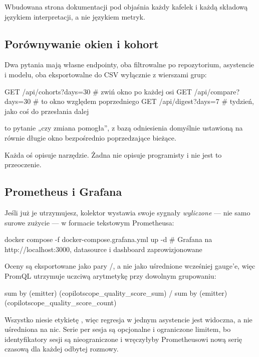 \documentclass[11pt,a4paper]{article}
\newcommand{\code}[1]{\texttt{\detokenize{#1}}}
\begin{document}
Wbudowana strona dokumentacji pod \code{/docs} objaśnia każdy kafelek i każdą
składową językiem interpretacji, a nie językiem metryk.

\subsection{Porównywanie okien i kohort}

Dwa pytania mają własne endpointy, oba filtrowalne po repozytorium, asystencie i
modelu, oba eksportowalne do CSV wyłącznie z wierszami grup:

\begin{shell}
GET /api/cohorts?days=30      # zwiń okno po każdej osi
GET /api/compare?days=30      # to okno względem poprzedniego
GET /api/digest?days=7        # tydzień, jako coś do przesłania dalej
\end{shell}

\code{/api/compare} to pytanie „czy zmiana pomogła'', z bazą odniesienia
domyślnie ustawioną na równie długie okno bezpośrednio poprzedzające bieżące.

Każda oś opisuje narzędzie. Żadna nie opisuje programisty i nie jest to
przeoczenie.

\subsection{Prometheus i Grafana}

Jeśli już je utrzymujesz, kolektor wystawia swoje sygnały \emph{wyliczone} ---
nie samo surowe zużycie --- w formacie tekstowym Prometheusa:

\begin{shell}
docker compose -f docker-compose.grafana.yml up -d
# Grafana na http://localhost:3000, datasource i dashboard zaprowizjonowane
\end{shell}

Oceny są eksportowane jako pary \code{_sum}/\code{_count}, a nie jako
uśrednione wcześniej gauge'e, więc PromQL utrzymuje uczciwą arytmetykę przy
dowolnym grupowaniu:

\begin{shell}
sum by (emitter) (copilotscope_quality_score_sum)
  / sum by (emitter) (copilotscope_quality_score_count)
\end{shell}

Wszystko niesie etykietę \code{emitter}, więc regresja w jednym asystencie jest
widoczna, a nie uśredniona na nic. Serie per sesja są opcjonalne i ograniczone
limitem, bo identyfikatory sesji są nieograniczone i wręczyłyby Prometheusowi
nową serię czasową dla każdej odbytej rozmowy.
\end{document}
